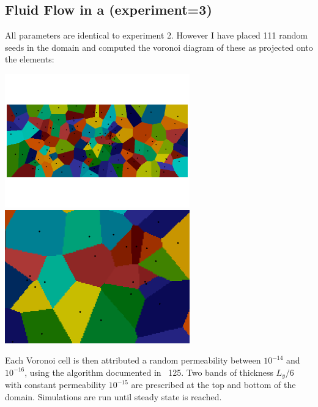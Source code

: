 \subsection*{Fluid Flow in a  (experiment=3)}

All parameters are identical to experiment 2. However I have placed
111 random seeds in the domain and computed the voronoi diagram of these 
as projected onto the elements:

\begin{center}
\includegraphics[width=8cm]{python_codes/fieldstone_128/results/experiment3/cells}
\includegraphics[width=8cm]{python_codes/fieldstone_128/results/experiment3/cells_zoom}
\end{center}

Each Voronoi cell is then 
attributed a random permeability between $10^{-14}$ and $10^{-16}$, 
using the algorithm documented in \stone~125.
Two bands of thickness $L_y/6$ with constant permeability $10^{-15}$ are 
prescribed at the top and bottom of the domain.
Simulations are run until steady state is reached. 

